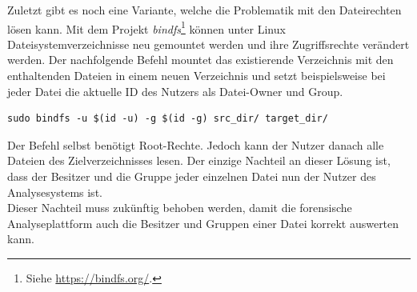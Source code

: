 \noindent
Zuletzt gibt es noch eine Variante, welche die Problematik mit den Dateirechten lösen kann. 
Mit dem Projekt \textit{bindfs}\footnote{Siehe \url{https://bindfs.org/}.} können unter Linux Dateisystemverzeichnisse neu gemountet werden und ihre Zugriffsrechte verändert werden. Der nachfolgende Befehl mountet das existierende Verzeichnis mit den enthaltenden Dateien in einem neuen Verzeichnis und setzt beispielsweise bei jeder Datei die aktuelle ID des Nutzers als Datei-Owner und Group. 
\begin{lstlisting}[label={lst:bindfs_command},caption= Nutzung von Bindfs zum Ändern von Dateirechten,captionpos=b,frame=single,style=customshell]
sudo bindfs -u $(id -u) -g $(id -g) src_dir/ target_dir/
\end{lstlisting}
Der Befehl selbst benötigt Root-Rechte. Jedoch kann der Nutzer danach alle Dateien des Zielverzeichnisses lesen. Der einzige Nachteil an dieser Lösung ist, dass der Besitzer und die Gruppe jeder einzelnen Datei nun der Nutzer des Analysesystems ist.\\
Dieser Nachteil muss zukünftig behoben werden, damit die forensische Analyseplattform auch die Besitzer und Gruppen einer Datei korrekt auswerten kann.
